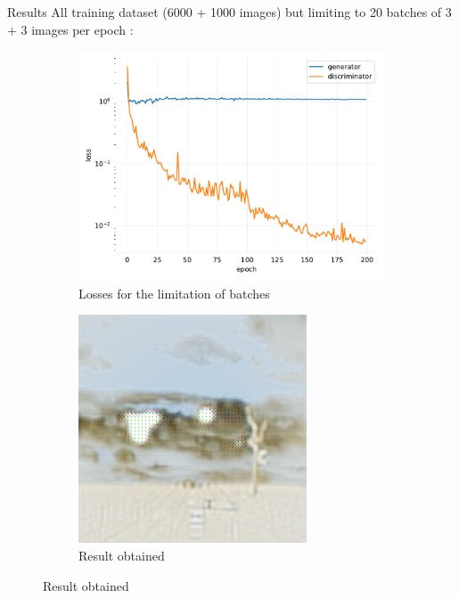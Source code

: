 \documentclass[12pt]{beamer}
\begin{document}
    \begin{frame}{Results}
        All training dataset (6000 + 1000 images) but limiting to 20 batches of 3 + 3 images per epoch :

        \begin{figure}[H]
            \centering
            \begin{subfigure}[b]{0.55\textwidth}
                \centering
                \includegraphics[width=\textwidth]{resources/cycle-gan/batch-limited.pdf}
                \caption{Losses for the limitation of batches}
            \end{subfigure}
            \hfill
            \begin{subfigure}[b]{0.4\textwidth}
                \centering
                \includegraphics[width=\textwidth]{resources/cycle-gan/white.png}
                \caption{Result obtained}
            \end{subfigure}
        \end{figure}
    \end{frame}
    
\end{document}
